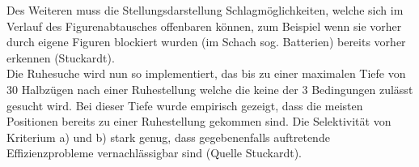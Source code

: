Des Weiteren muss die Stellungsdarstellung Schlagmöglichkeiten, welche sich im Verlauf des Figurenabtausches offenbaren können, zum Beispiel wenn sie vorher durch eigene Figuren blockiert wurden (im Schach sog. Batterien) bereits vorher erkennen (Stuckardt).\\
Die Ruhesuche wird nun so implementiert, das bis zu einer maximalen Tiefe von 30 Halbzügen nach einer Ruhestellung welche die keine der 3 Bedingungen zulässt gesucht wird.
Bei dieser Tiefe wurde empirisch gezeigt, dass die meisten Positionen bereits zu einer Ruhestellung gekommen sind.
Die Selektivität von Kriterium a) und b) stark genug, dass gegebenenfalls auftretende Effizienzprobleme vernachlässigbar sind (Quelle Stuckardt).
